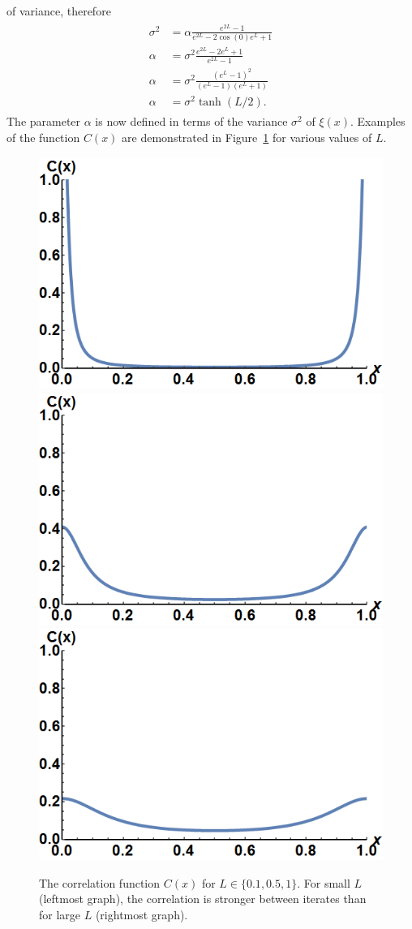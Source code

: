 of variance, therefore
\begin{align}
\begin{split}\label{a}
\sigma^2&= \alpha \frac{e^{2L}-1}{e^{2L}-2\cos(0)e^L+1}\\
\alpha &=\sigma^2 \frac{e^{2L}-2e^{L} +1}{e^{2L}-1}\\
\alpha &=\sigma^2
\frac{(e^{L}-1)^2}{(e^{L}-1)(e^{L}+1)}\\
\alpha &= \sigma^2 \tanh(L/2).
\end{split}
\end{align}
The parameter $\alpha$ is now defined in terms of the variance
$\sigma^2$ of $\xi(x)$. Examples of the function $C(x)$ are demonstrated in Figure~\ref{fig:correlation}
for various values of $L$.
\begin{figure}[htp]
\caption[The correlation function $C(x)$]{The correlation function
  $C(x)$ for $L \in \{0.1,0.5,1\}$. For small $L$
  (leftmost graph), the correlation is stronger between iterates than for large $L$
  (rightmost graph).}\label{fig:correlation}
\centering
\includegraphics[width=.3\textwidth]{figs/correlation_L01.png}\hfill
\includegraphics[width=.3\textwidth]{figs/correlation_L05.png}\hfill
\includegraphics[width=.3\textwidth]{figs/correlation_L1.png}
\end{figure}

